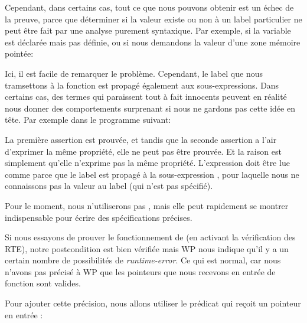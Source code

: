 Cependant, dans certains cas, tout ce que nous pouvons obtenir est un échec de
la preuve, parce que déterminer si la valeur existe ou non à un label particulier
ne peut être fait par une analyse purement syntaxique. Par exemple, si la variable
est déclarée mais pas définie, ou si nous demandons la valeur d'une zone mémoire
pointée:




Ici, il est facile de remarquer le problème. Cependant, le label que nous
tramsettons à la fonction  est propagé également
aux sous-expressions. Dans certains cas, des termes qui paraissent tout à fait
innocents peuvent en réalité nous donner des comportements surprenant si nous
ne gardons pas cette idée en tête. Par exemple dans le programme suivant:




La première assertion est prouvée, et tandis que la seconde assertion a l'air
d'exprimer la même propriété, elle ne peut pas être prouvée. Et la raison est
simplement qu'elle n'exprime pas la même propriété. L'expression
 doit être lue comme
 parce que le
label est propagé à la sous-expression , pour laquelle nous ne
connaissons pas la valeur au label  (qui n'est pas spécifié).


Pour le moment, nous n'utiliserons pas , mais elle peut rapidement se
montrer indispensable pour écrire des spécifications précises.





Si nous essayons de prouver le fonctionnement de  (en activant
la vérification des RTE), notre postcondition est bien vérifiée mais WP nous 
indique qu'il y a un certain nombre de possibilités de \textit{runtime-error}. Ce qui 
est normal, car nous n'avons pas précisé à WP que les pointeurs que nous
recevons en entrée de fonction sont valides.



Pour ajouter cette précision, nous allons utiliser le prédicat  qui
reçoit un pointeur en entrée :






